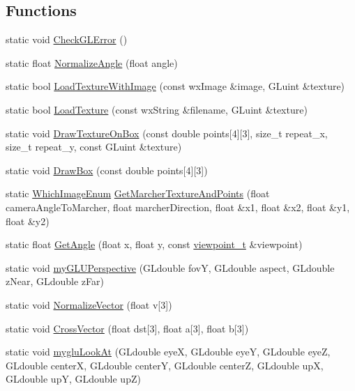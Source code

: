 \subsection*{Functions}
\begin{DoxyCompactItemize}
\item 
static void \hyperlink{a00184_a82290bd864c9aedc72c1c18c5f14cf59}{Check\-G\-L\-Error} ()
\item 
static float \hyperlink{a00184_a6bab5a34c9f98b34bcf5ba8ae6987078}{Normalize\-Angle} (float angle)
\item 
static bool \hyperlink{a00184_ac3e73513941e0eb73edde3bdb55adb5f}{Load\-Texture\-With\-Image} (const wx\-Image \&image, G\-Luint \&texture)
\item 
static bool \hyperlink{a00184_a81ffb278efb0eb8c0e1dd9a7d28f5e61}{Load\-Texture} (const wx\-String \&filename, G\-Luint \&texture)
\item 
static void \hyperlink{a00184_a806c439549c50076bf1d8461d03aa958}{Draw\-Texture\-On\-Box} (const double points\mbox{[}4\mbox{]}\mbox{[}3\mbox{]}, size\-\_\-t repeat\-\_\-x, size\-\_\-t repeat\-\_\-y, const G\-Luint \&texture)
\item 
static void \hyperlink{a00184_a0e528bb0de1c8e76bd1a98e764a4270e}{Draw\-Box} (const double points\mbox{[}4\mbox{]}\mbox{[}3\mbox{]})
\item 
static \hyperlink{a00184_a7eb3720b4254c41f480c577182480c7b}{Which\-Image\-Enum} \hyperlink{a00184_ac47946db13533bbad33440b922a34933}{Get\-Marcher\-Texture\-And\-Points} (float camera\-Angle\-To\-Marcher, float marcher\-Direction, float \&x1, float \&x2, float \&y1, float \&y2)
\item 
static float \hyperlink{a00184_a3c471cdeb57ae4fdb484558445fe7d67}{Get\-Angle} (float x, float y, const \hyperlink{a00154}{viewpoint\-\_\-t} \&viewpoint)
\item 
static void \hyperlink{a00184_a0a9f6a541594afcdc584e1fb048ac30a}{my\-G\-L\-U\-Perspective} (G\-Ldouble fov\-Y, G\-Ldouble aspect, G\-Ldouble z\-Near, G\-Ldouble z\-Far)
\item 
static void \hyperlink{a00184_a2303868e47d86b75ed835cea0cf0e1d5}{Normalize\-Vector} (float v\mbox{[}3\mbox{]})
\item 
static void \hyperlink{a00184_acabd1c0272eaa77006634c782e3594d3}{Cross\-Vector} (float dst\mbox{[}3\mbox{]}, float a\mbox{[}3\mbox{]}, float b\mbox{[}3\mbox{]})
\item 
static void \hyperlink{a00184_abae28a7ac8bc4ea623d92b9842b5fb38}{myglu\-Look\-At} (G\-Ldouble eye\-X, G\-Ldouble eye\-Y, G\-Ldouble eye\-Z, G\-Ldouble center\-X, G\-Ldouble center\-Y, G\-Ldouble center\-Z, G\-Ldouble up\-X, G\-Ldouble up\-Y, G\-Ldouble up\-Z)
\end{DoxyCompactItemize}
